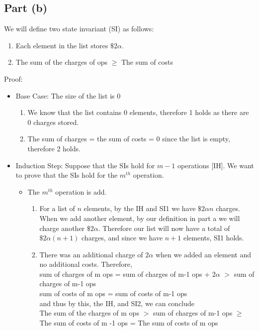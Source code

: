 \documentclass{article}
\begin{document}
\subsection*{Part (b)}
We will define two state invariant (SI) as follows:
\begin{enumerate}
    \item Each element in the list stores $\$2\alpha$.
    \item The sum of the charges of ops $\geq$ The sum of costs
\end{enumerate}
Proof:
\begin{itemize}
    \item Base Case: The size of the list is 0\\
        \begin{enumerate}
            \item We know that the list contains 0 elements, therefore 1 holds as there are 0 charges stored.
            \item The sum of charges = the sum of costs = 0 since the list is empty, therefore 2 holds.
        \end{enumerate}
    \item Induction Step: Suppose that the SIs hold for $m-1$ operations [IH]. We want to prove that the SIs hold for the $m^{th}$ operation.
        \begin{itemize}
            \item The $m^{th}$ operation is add.
                \begin{enumerate}
                    \item For a list of $n$ elements, by the IH and SI1 we have $\$2\alpha{n}$ charges. When we add another element, by our definition in part a we will charge another $\$2\alpha$. Therefore our list will now have a total of $\$2\alpha(n+1)$ charges, and since we have $n+1$ elements, SI1 holds.
                    \item There was an additional charge of $2\alpha$ when we added an element and no additional costs. Therefore, \\
                    sum of charges of m ops = sum of charges of m-1 ops + $2\alpha$ $>$ sum of charges of m-1 ops \\
                    sum of costs of m ops = sum of costs of m-1 ops \\
                    and thus by this, the IH, and SI2, we can conclude \\
                    The sum of the charges of m ops $>$ sum of charges of m-1 ops $\geq$ The sum of costs of m -1 ops = The sum of costs of m ops \\

\end{enumerate}
\end{itemize}
\end{itemize}
\end{document}
